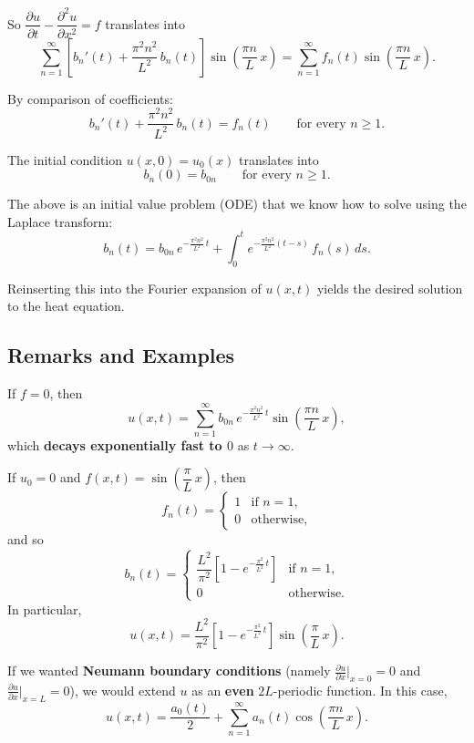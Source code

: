 So $\dfrac{\partial u}{\partial t} - \dfrac{\partial^2 u}{\partial x^2} = f$ translates into
\[
\sum_{n=1}^{\infty}\left[b_n'(t) + \frac{\pi^2 n^2}{L^2}\,b_n(t)\right]\sin\!\left(\frac{\pi n}{L}\,x\right)
= \sum_{n=1}^{\infty} f_n(t)\sin\!\left(\frac{\pi n}{L}\,x\right).
\]

By comparison of coefficients:
\[
\boxed{b_n'(t) + \frac{\pi^2 n^2}{L^2}\,b_n(t) = f_n(t) \qquad \text{for every } n \geq 1.}
\]

The initial condition $u(x, 0) = u_0(x)$ translates into
\[
\boxed{b_n(0) = b_{0n} \qquad \text{for every } n \geq 1.}
\]

The above is an initial value problem (ODE) that we know how to solve using the Laplace transform:
\[
\boxed{b_n(t) = b_{0n}\,e^{-\frac{\pi^2 n^2}{L^2}\,t} + \int_0^t e^{-\frac{\pi^2 n^2}{L^2}(t - s)}\,f_n(s)\,ds.}
\]

Reinserting this into the Fourier expansion of $u(x, t)$ yields the desired solution to the heat equation.

\subsection{Remarks and Examples}

\begin{remark}
If $f = 0$, then
\[
u(x, t) = \sum_{n=1}^{\infty} b_{0n}\,e^{-\frac{\pi^2 n^2}{L^2}\,t}\sin\!\left(\frac{\pi n}{L}\,x\right),
\]
which \textbf{decays exponentially fast to $0$} as $t \to \infty$.
\end{remark}

\begin{example}
If $u_0 = 0$ and $f(x, t) = \sin\!\left(\dfrac{\pi}{L}\,x\right)$, then
\[
f_n(t) = \begin{cases} 1 & \text{if } n = 1, \\ 0 & \text{otherwise,} \end{cases}
\]
and so
\[
b_n(t) = \begin{cases}
\dfrac{L^2}{\pi^2}\left[1 - e^{-\frac{\pi^2}{L^2}\,t}\right] & \text{if } n = 1, \\[6pt]
0 & \text{otherwise.}
\end{cases}
\]
In particular,
\[
u(x, t) = \frac{L^2}{\pi^2}\left[1 - e^{-\frac{\pi^2}{L^2}\,t}\right]\sin\!\left(\frac{\pi}{L}\,x\right).
\]
\end{example}

\begin{remark}
If we wanted \textbf{Neumann boundary conditions} (namely $\frac{\partial u}{\partial x}|_{x=0} = 0$ and $\frac{\partial u}{\partial x}|_{x=L} = 0$), we would extend $u$ as an \textbf{even} $2L$-periodic function. In this case,
\[
u(x, t) = \frac{a_0(t)}{2} + \sum_{n=1}^{\infty} a_n(t)\cos\!\left(\frac{\pi n}{L}\,x\right).
\]
\end{remark}

